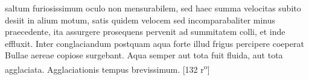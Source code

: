 saltum furiosissimum oculo non mensurabilem, sed haec summa velocitas subito  desiit in alium motum, satis quidem velocem sed incomparabaliter minus praecedente, ita assurgere prosequens pervenit ad summitatem colli, et inde effluxit. Inter conglaciandum  postquam aqua forte illud frigus\protect{} percipere coeperat Bullae aereae copiose surgebant.  Aqua semper aut tota fuit fluida, aut tota agglaciata. Agglaciationis tempus brevissimum. [132 r\textsuperscript{o}]